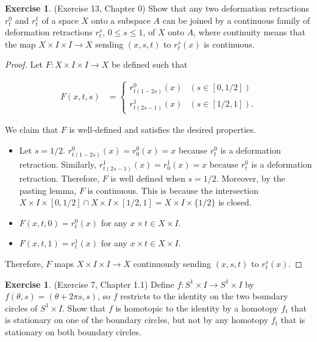 \documentclass[12pt, psamsfonts]{amsart}
\theoremstyle{definition}
\newtheorem{exer}[thm]{Exercise}
\theoremstyle{remark}
\numberwithin{equation}{section}
\begin{document}
\begin{exer}{(Exercise 13, Chapter 0)}
  Show that any two deformation retractions $r_t^0$ and $r_t^1$ of a space $X$ onto a subspace $A$ can be joined by a continuous family of deformation retractions $r^s_t$, $0 \leq s \leq 1$, of $X$ onto $A$, where continuity means that the map $X \times I \times I \rightarrow X$ sending $(x, s, t)$ to $r^s_t(x)$ is continuous.
\end{exer}

\begin{proof}
  Let $F: X \times I \times I \rightarrow X$ be defined such that

  \begin{align*}
    F(x, t, s) &= \begin{cases}
      r_{t(1 - 2s)}^0(x) & (s \in [0, 1/2]) \\
      r_{t(2s - 1)}^1(x) & (s \in [1/2, 1]).
    \end{cases}
  \end{align*}

  We claim that $F$ is well-defined and satisfies the desired properties.

  \begin{itemize}
    \item
      Let $s = 1 / 2$.
      $r_{t(1 - 2s)}^0(x) = r_0^0(x) = x$ because $r^0_t$ is a deformation retraction.
      Similarly, $r_{t(2s - 1)}^1(x) = r_0^1(x) = x$ because $r^0_t$ is a deformation retraction.
      Therefore, $F$ is well defined when $s = 1/2$.
      Moreover, by the pasting lemma, $F$ is continuous.
      This is because the intersection $X \times I \times [0, 1/2] \cap X \times I \times [1/2, 1] = X \times I \times \{ 1/2 \}$ is closed.
    \item
      $F(x, t, 0) = r_t^0(x)$ for any $x \times t \in X \times I$.
    \item
      $F(x, t, 1) = r_t^1(x)$ for any $x \times t \in X \times I$.
  \end{itemize}

  Therefore, $F$ maps $X \times I \times I \rightarrow X$ continuously sending $(x, s, t)$ to $r^s_t(x)$.
\end{proof}

\begin{exer}{(Exercise 7, Chapter 1.1)}
  Define $f: S^1 \times I \rightarrow S^1 \times I$ by $f(\theta, s) = (\theta + 2\pi s, s)$, so $f$ restricts to the identity on the two boundary circles of $S^1 \times I$.
  Show that $f$ is homotopic to the identity by a homotopy $f_t$ that is stationary on one of the boundary circles, but not by any homotopy $f_t$ that is stationary on both boundary circles.
\end{exer}
\end{document}
